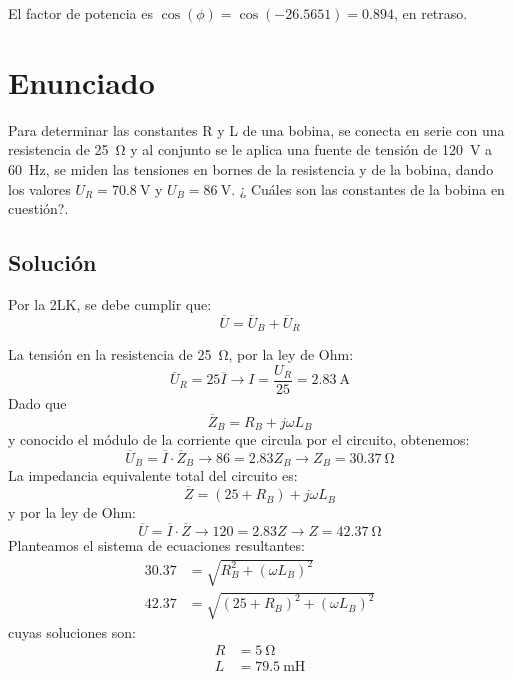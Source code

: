 El factor de potencia es $\cos(\phi)=\cos(-26.5651)=0.894$, en
retraso.



\section{Enunciado}
Para determinar las constantes R y L de una bobina, se conecta en serie con una resistencia de \qty{25}{\ohm} y al conjunto se le aplica una fuente de tensión de \qty{120}{\volt} a \qty{60}{\hertz}, se miden las tensiones en bornes de la resistencia y de la bobina, dando los valores $U_R = \qty{70.8}{\volt}$ y $U_B = \qty{86}{\volt}$. ¿ Cuáles son las constantes de la bobina en cuestión?.

\subsection*{Solución}

Por la 2LK, se debe cumplir que:
\begin{equation*}
  \overline{U} = \overline{U}_B + \overline{U}_R
\end{equation*}


La tensión en la resistencia de \qty{25}{\ohm}, por la ley de Ohm:
\begin{equation*}
  \overline{U}_R = 25 \overline{I} \rightarrow I = \frac{U_R}{25} = \qty{2.83}{\ampere}
\end{equation*}
Dado que
\begin{equation*}
  \overline{Z}_B = R_B + j\omega L_B
\end{equation*}
y conocido el módulo de la corriente que circula por el circuito, obtenemos:
\begin{equation*}
  \overline{U}_B = \overline{I} \cdot \overline{Z}_B \rightarrow 86 = 2.83 Z_B \rightarrow Z_B = \qty{30.37}{\ohm}
\end{equation*}
La impedancia equivalente total del circuito es:
\begin{equation*}
  \overline{Z} = (25 + R_B) + j\omega L_B
\end{equation*}
y por la ley de Ohm:
\begin{equation*}
  \overline{U} = \overline{I} \cdot \overline{Z} \rightarrow 120 = 2.83 Z \rightarrow Z = \qty{42.37}{\ohm}
\end{equation*}
Planteamos el sistema de ecuaciones resultantes:
\begin{align*}
  30.37 &= \sqrt{R^2_B + (\omega L_B)^2}\\
  42.37 &= \sqrt{(25 + R_B)^2 + (\omega L_B)^2}
\end{align*}
cuyas soluciones son:
\begin{align*}
  R &= \qty{5}{\ohm}\\
  L &= \qty{79.5}{\milli\henry}
\end{align*}

